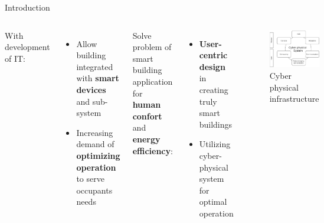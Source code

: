 \documentclass[aspectratio=169]{beamer}
\begin{document}
\begin{frame}{Introduction}
\begin{columns}
    With development of IT:\\
    \begin{itemize}[label=$\circ$]
        \item Allow building integrated with \textbf{smart devices} and sub-system
        \item Increasing demand of \textbf{optimizing operation} to serve occupants needs
    \end{itemize}
    
    Solve problem of smart building application for \textbf{human confort} and \textbf{energy efficiency}:
    \begin{itemize}[label=$\circ$]
        \item \textbf{User-centric design} in creating truly smart buildings
        \item Utilizing cyber-physical system for optimal operation
    \end{itemize}


\begin{figure}
    \includegraphics[scale=0.24]{pic/Cyber-Physical-system-key-characteristics.png}
    \caption{Cyber physical infrastructure}
    \label{fig:enter-label}
\end{figure}    
    
\end{columns}

\end{frame}
\end{document}
